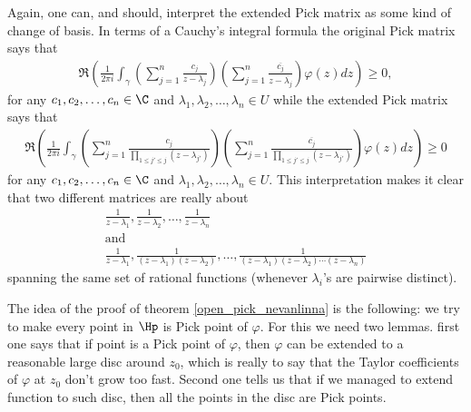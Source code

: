 Again, one can, and should, interpret the extended Pick matrix as some kind of change of basis. In terms of a Cauchy's integral formula the original Pick matrix says that
\begin{align*}
	\Re\left(\frac{1}{2 \pi i} \int_{\gamma} \left(\sum_{j = 1}^{n} \frac{c_{j}}{z - \lambda_{j}}\right)\left(\sum_{j = 1}^{n} \frac{\overline{c_{j}}}{z - \overline{\lambda_{j}}}\right) \varphi(z) dz \right) \geq 0,
\end{align*}
for any $c_{1}, c_{2}, \ldots, c_{n} \in \C$ and $\lambda_{1}, \lambda_{2}, \ldots, \lambda_{n} \in U$ while the extended Pick matrix says that
\begin{align*}
	\Re\left(\frac{1}{2 \pi i} \int_{\gamma} \left(\sum_{j = 1}^{n} \frac{c_{j}}{\prod_{1 \leq j' \leq j}(z - \lambda_{j'})}\right)\left(\sum_{j = 1}^{n} \frac{\overline{c_{j}}}{\prod_{1 \leq j' \leq j}(z - \overline{\lambda_{j'}})}\right) \varphi(z) dz \right) \geq 0
\end{align*}
for any $c_{1}, c_{2}, \ldots, c_{n} \in \C$ and $\lambda_{1}, \lambda_{2}, \ldots, \lambda_{n} \in U$. This interpretation makes it clear that two different matrices are really about
\begin{gather*}
	\frac{1}{z - \lambda_{1}}, \frac{1}{z - \lambda_{2}}, \ldots, \frac{1}{z - \lambda_{n}} \\
	\text{and} \\
	\frac{1}{z - \lambda_{1}}, \frac{1}{(z - \lambda_{1})(z - \lambda_{2})}, \ldots, \frac{1}{(z - \lambda_{1}) (z - \lambda_{2}) \cdots (z - \lambda_{n})}
\end{gather*}
spanning the same set of rational functions (whenever $\lambda_{i}$'s are pairwise distinct).

The idea of the proof of theorem \ref{open_pick_nevanlinna} is the following: we try to make every point in $\Hp$ is Pick point of $\varphi$. For this we need two lemmas. first one says that if point is a Pick point of $\varphi$, then $\varphi$ can be extended to a reasonable large disc around $z_{0}$, which is really to say that the Taylor coefficients of $\varphi$ at $z_{0}$ don't grow too fast. Second one tells us that if we managed to extend function to such disc, then all the points in the disc are Pick points.


